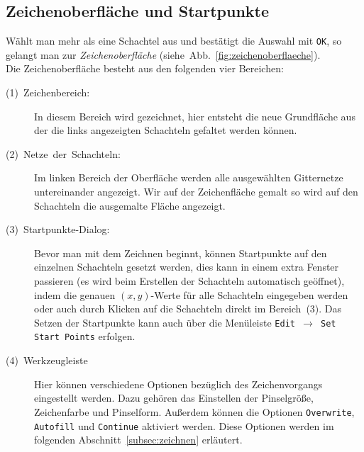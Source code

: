 \subsection{Zeichenoberfläche und Startpunkte}
\label{subsec:zeichenoberflaeche}

Wählt man mehr als eine Schachtel aus und bestätigt die Auswahl mit \texttt{OK}, so gelangt man zur \emph{Zeichenoberfläche} (siehe~Abb.~\ref{fig:zeichenoberflaeche}).\\

Die Zeichenoberfläche besteht aus den folgenden vier Bereichen:

  \begin{description}
    \item [{(1)~Zeichenbereich:}] In diesem Bereich wird gezeichnet, hier     entsteht die neue Grundfläche aus der die links angezeigten Schachteln   gefaltet werden können.
    \item [(2)~Netze~der~Schachteln:] Im linken Bereich der Oberfläche werden alle ausgewählten Gitternetze untereinander angezeigt. Wir auf der Zeichenfläche gemalt so wird auf den Schachteln die ausgemalte Fläche angezeigt.
    \item [(3)~Startpunkte-Dialog:] Bevor man mit dem Zeichnen beginnt, können Startpunkte auf den einzelnen Schachteln gesetzt werden, dies kann in einem extra Fenster passieren (es wird beim Erstellen der Schachteln automatisch geöffnet), indem die genauen $(x,y)$-Werte für alle Schachteln eingegeben werden oder auch durch Klicken auf die Schachteln direkt im Bereich~(3). Das Setzen der Startpunkte kann auch über die Menüleiste \texttt{Edit $\rightarrow$ Set Start Points} erfolgen.
    \item [(4)~Werkzeugleiste] Hier können verschiedene Optionen bezüglich des Zeichenvorgangs eingestellt werden. Dazu gehören das Einstellen der Pinselgröße, Zeichenfarbe und Pinselform. Außerdem können die Optionen \texttt{Overwrite}, \texttt{Autofill} und \texttt{Continue} aktiviert werden. Diese Optionen werden im folgenden Abschnitt~\ref{subsec:zeichnen} erläutert.
  \end{description}

